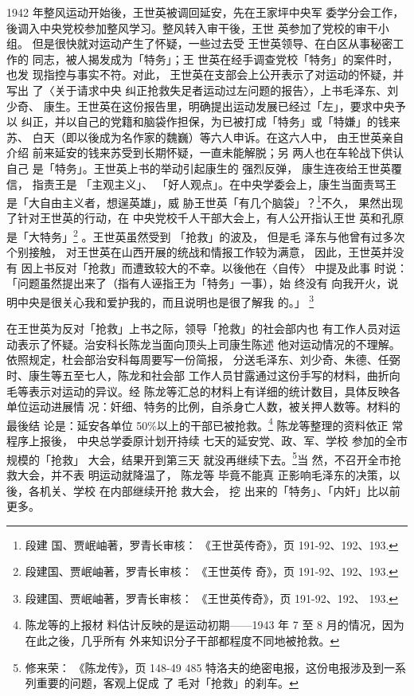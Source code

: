 1942 年整风运动开始後，王世英被调回延安，先在王家坪中央军 委学分会工作，
後调入中央党校参加整风学习。整风转入审干後，王世 英参加了党校的审干小组。
但是很快就对运动产生了怀疑，一些过去受 王世英领导、在白区从事秘密工作的
同志，被人揭发成为「特务」；王 世英在经手调查党校「特务」的案件时，也发
现指控与事实不符。对此， 王世英在支部会上公开表示了对运动的怀疑，并写出
了〈关于请求中央 纠正抢救失足者运动过左问题的报告〉，上书毛泽东、刘少奇、
康生。王世英在这份报告里，明确提出运动发展已经过「左」，要求中央予以
纠正，并以自己的党籍和脑袋作担保，为已被打成「特务」或「特嫌」的钱来苏、
白天（即以後成为名作家的魏巍）等六人申诉。在这六人中， 由王世英亲自介绍
前来延安的钱来苏受到长期怀疑，一直未能解脱；另 两人也在车轮战下供认自己
是「特务」。王世英上书的举动引起康生的 强烈反弹， 康生连夜给王世英覆信，
指责王是 「主观主义」、 「好人观点」。在中央学委会上，康生当面责骂王
是「大自由主义者，想逞英雄」，威 胁王世英「有几个脑袋」？\footnote{段建
国、贾岷岫著，罗青长审核： 《王世英传奇》，页 191-92、192、193.}不久，
果然出现了针对王世英的行动，在 中央党校千人干部大会上，有人公开指认王世
英和孔原是「大特务」\footnote{段建国、贾岷岫著，罗青长审核： 《王世英传
奇》，页 191-92、192、193.} 。王世英虽然受到 「抢救」的波及， 但是毛
泽东与他曾有过多次个别接触， 对王世英在山西开展的统战和情报工作较为满意，
因此，王世英并没有 因上书反对「抢救」而遭致较大的不幸。以後他在〈自传〉
中提及此事 时说： 「问题虽然提出来了（指有人诬指王为「特务」一事），始
终没有 向我开火，说明中央是很关心我和爱护我的，而且说明也是很了解我 的。」
\footnote{段建国、贾岷岫著，罗青长审核： 《王世英传奇》，页 191-92、192、
193.} 

在王世英为反对「抢救」上书之际，领导「抢救」的社会部内也 有工作人员对运
动表示了怀疑。治安科长陈龙当面向顶头上司康生陈述 他对运动情况的不理解。
依照规定，杜会部治安科每周要写一份简报， 分送毛泽东、刘少奇、朱德、任弼
时、康生等五至七人，陈龙和社会部 工作人员甘露通过这份手写的材料，曲折向
毛等表示对运动的异议。经 陈龙等汇总的材料上有详细的统计数目，具体反映各
单位运动进展情 况：奸细、特务的比例，自杀身亡人数，被关押人数等。材料的
最後结 论是：延安各单位 50\%以上的干部已被抢救。\footnote{陈龙等的上报材
料估计反映的是运动初期——1943 年 7 至 8 月的情况，因为在此之後，几乎所有
外来知识分子干部都程度不同地被抢救。} 陈龙等整理的资料依正 常程序上报後，
中央总学委原计划开持续 七天的延安党、政、军、学校 参加的全市规模的「抢救」
大会，结果开到第三天 就没再继续下去。\footnote{修来荣： 《陈龙传》，页
148-49 485 特洛夫的绝密电报，这份电报涉及到一系列重要的问题，客观上促成
了 毛对「抢救」的刹车。}当 然，不召开全市抢救大会，并不表 明运动就降温了，
陈龙等 毕竟不能真 正影响毛泽东的决策，以後，各机关、学校 在内部继续开抢
救大会， 挖 出来的「特务」、「内奸」比以前更多。

